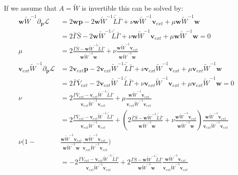 If we assume that $A=\tilde{W}$ is invertible this can be solved by:
\begin{align}
    \mathbf{w}\tilde W^{-1}\partial_{\mathbf p}\mathcal L&= 2 \mathbf{w}\mathbf{p}-2 \mathbf{w}\tilde W^{-1}\bar {\tilde L} \bar\Gamma+\nu\mathbf{w}\tilde W^{-1}\mathbf{v}_{ext} + \mu \mathbf{w}\tilde W^{-1}\mathbf{w}\\
    &=2\bar\Gamma\bar S -2 \mathbf{w}\tilde W^{-1}\bar {\tilde L} \bar\Gamma+\nu\mathbf{w}\tilde W^{-1}\mathbf{v}_{ext} + \mu \mathbf{w}\tilde W^{-1}\mathbf{w}=0\\
    \mu &= 2\frac{\bar\Gamma\bar S - \mathbf{w}\tilde W^{-1}\bar {\tilde L} \bar\Gamma}{\mathbf{w}\tilde W^{-1}\mathbf{w}}+\nu\frac{\mathbf{w}\tilde W^{-1}\mathbf{v}_{ext}}{\mathbf{w}\tilde W^{-1}\mathbf{w}}\\
    \mathbf{v}_{ext}\tilde W^{-1}\partial_{\mathbf p}\mathcal L&= 2 \mathbf{v}_{ext}\mathbf{p}-2 \mathbf{v}_{ext}\tilde W^{-1}\bar {\tilde L} \bar\Gamma+\nu\mathbf{v}_{ext}\tilde W^{-1}\mathbf{v}_{ext} + \mu \mathbf{v}_{ext}\tilde W^{-1}\mathbf{w}\\
    &=2\bar\Gamma \bar{V}_{ext} -2 \mathbf{v}_{ext}\tilde W^{-1}\bar {\tilde L} \bar\Gamma+\nu\mathbf{v}_{ext}\tilde W^{-1}\mathbf{v}_{ext} + \mu \mathbf{v}_{ext}\tilde W^{-1}\mathbf{w}=0\\
    \nu &= 2\frac{\bar\Gamma \bar{V}_{ext} - \mathbf{v}_{ext}\tilde W^{-1}\bar {\tilde L} \bar\Gamma}{\mathbf{v}_{ext}\tilde W^{-1}\mathbf{v}_{ext}}+\mu\frac{\mathbf{w}\tilde W^{-1}\mathbf{v}_{ext}}{\mathbf{v}_{ext}\tilde W^{-1}\mathbf{v}_{ext}}\\
    &= 2\frac{\bar\Gamma \bar{V}_{ext} - \mathbf{v}_{ext}\tilde W^{-1}\bar {\tilde L} \bar\Gamma}{\mathbf{v}_{ext}\tilde W^{-1}\mathbf{v}_{ext}}+\left(2\frac{\bar\Gamma\bar S - \mathbf{w}\tilde W^{-1}\bar {\tilde L} \bar\Gamma}{\mathbf{w}\tilde W^{-1}\mathbf{w}}+\nu\frac{\mathbf{w}\tilde W^{-1}\mathbf{v}_{ext}}{\mathbf{w}\tilde W^{-1}\mathbf{w}}\right)\frac{\mathbf{w}\tilde W^{-1}\mathbf{v}_{ext}}{\mathbf{v}_{ext}\tilde W^{-1}\mathbf{v}_{ext}}\\
    \nu(1-&\frac{\mathbf{w}\tilde W^{-1}\mathbf{v}_{ext}}{\mathbf{w}\tilde W^{-1}\mathbf{w}}\frac{\mathbf{w}\tilde W^{-1}\mathbf{v}_{ext}}{\mathbf{v}_{ext}\tilde W^{-1}\mathbf{v}_{ext}})\\
    &= -2\frac{\bar\Gamma \bar{V}_{ext} - \mathbf{v}_{ext}\tilde W^{-1}\bar {\tilde L} \bar\Gamma}{\mathbf{v}_{ext}\tilde W^{-1}\mathbf{v}_{ext}}+2\frac{\bar\Gamma\bar S - \mathbf{w}\tilde W^{-1}\bar {\tilde L} \bar\Gamma}{\mathbf{w}\tilde W^{-1}\mathbf{w}}\frac{\mathbf{w}\tilde W^{-1}\mathbf{v}_{ext}}{\mathbf{v}_{ext}\tilde W^{-1}\mathbf{v}_{ext}}\\

\end{align}
